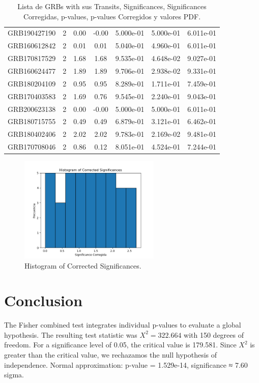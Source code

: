 \documentclass[12pt]{article}
\begin{document}
\begin{table}[h!]
{\begin{tabular}{l c c c c c c}
GRB190427190 & 2 & 0.00 & -0.00 & 5.000e-01 & 5.000e-01 & 6.011e-01 \\
GRB160612842 & 2 & 0.01 & 0.01 & 5.040e-01 & 4.960e-01 & 6.011e-01 \\
GRB170817529 & 2 & 1.68 & 1.68 & 9.535e-01 & 4.648e-02 & 9.027e-01 \\
GRB160624477 & 2 & 1.89 & 1.89 & 9.706e-01 & 2.938e-02 & 9.331e-01 \\
GRB180204109 & 2 & 0.95 & 0.95 & 8.289e-01 & 1.711e-01 & 7.459e-01 \\
GRB170403583 & 2 & 1.69 & 0.76 & 9.545e-01 & 2.240e-01 & 9.043e-01 \\
GRB200623138 & 2 & 0.00 & -0.00 & 5.000e-01 & 5.000e-01 & 6.011e-01 \\
GRB180715755 & 2 & 0.49 & 0.49 & 6.879e-01 & 3.121e-01 & 6.462e-01 \\
GRB180402406 & 2 & 2.02 & 2.02 & 9.783e-01 & 2.169e-02 & 9.481e-01 \\
GRB170708046 & 2 & 0.86 & 0.12 & 8.051e-01 & 4.524e-01 & 7.244e-01 \\
\bottomrule
\end{tabular}%
}
\caption{Lista de GRBs with sus Transits, Significances, Significances Corregidas, p-values, p-values Corregidos y valores PDF.}
\end{table}

\begin{figure}[h!]
\centering
\includegraphics[width=0.6\textwidth]{corrected_significance_hist.png}
\caption{Histogram of Corrected Significances.}
\end{figure}

\section*{Conclusion}
The Fisher combined test integrates individual p-values to evaluate a global hypothesis.
The resulting test statistic was $X^2 = 322.664$ with 150 degrees of freedom.
For a significance level of 0.05, the critical value is 179.581.
Since $X^2$ is greater than the critical value, we rechazamos the null hypothesis of independence.
Normal approximation: p-value = 1.529e-14, significance ≈ 7.60 sigma.
\end{document}
